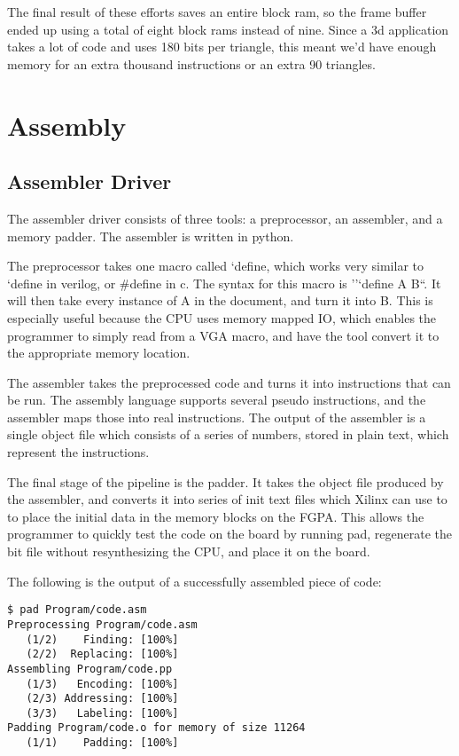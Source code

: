 \documentclass[onecolumn]{IEEEtran}
\begin{document}
The final result of these efforts saves an entire block ram, so the frame buffer ended up using a total of eight block rams instead of nine.  Since a 3d application takes a lot of code and uses 180 bits per triangle, this meant we’d have enough memory for an extra thousand instructions or an extra 90 triangles.

\section{Assembly}
\subsection{Assembler Driver}
The assembler driver consists of three tools: a preprocessor, an assembler, and a memory padder. The assembler is written in python.

The preprocessor takes one macro called `define, which works very similar to `define in verilog, or \#define in c.   The syntax for this macro is ''`define A B``. It will then take every instance of A in the document, and turn it into B.  This is especially useful because the CPU uses memory mapped IO, which enables the programmer to simply read from a VGA macro, and have the tool convert it to the appropriate memory location.

The assembler takes the preprocessed code and turns it into instructions that can be run.  The assembly language supports several pseudo instructions, and the assembler maps those into real instructions.  The output of the assembler is a single object file which consists of a series of numbers, stored in plain text, which represent the instructions.

The final stage of the pipeline is the padder. It takes the object file produced by the assembler, and converts it into series of init text files which Xilinx can use to to place the initial data in the memory blocks on the FGPA.  This allows the programmer to quickly test the code on the board by running pad, regenerate the bit file without resynthesizing the CPU, and place it on the board.

The following is the output of a successfully assembled piece of code:

\begin{verbatim}
$ pad Program/code.asm
Preprocessing Program/code.asm
   (1/2)    Finding: [100%]
   (2/2)  Replacing: [100%]
Assembling Program/code.pp
   (1/3)   Encoding: [100%]
   (2/3) Addressing: [100%]
   (3/3)   Labeling: [100%]
Padding Program/code.o for memory of size 11264
   (1/1)    Padding: [100%]
\end{verbatim}
\end{document}
